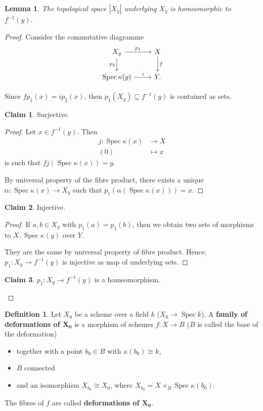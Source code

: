 \documentclass[12pt]{article}
\DeclareMathOperator{\Spec}{Spec}
\newtheorem*{lemma}{Lemma}
\theoremstyle{definition}
\newtheorem*{definition}{Definition}
\newtheorem*{claim}{Claim}
\begin{document}
\begin{lemma}
The topological space $|X_y|$ underlying $X_y$ is homeomorphic to $f^{-1}(y)$.
\end{lemma}

\begin{proof}
Consider the commutative diagramme
\[
\begin{tikzcd}
X_y\arrow[r,"p_1"]\arrow[d,"p_2",swap]&X\arrow[d,"f"]\\
\Spec\kappa(y)\arrow[r,"i"]&Y.
\end{tikzcd}
\]

Since $fp_1(x)=ip_2(x)$, then $p_1(X_y)\subseteq f^{-1}(y)$ is contained as sets.

\begin{claim}
Surjective.
\end{claim}

\begin{proof}
Let $x\in f^{-1}(y)$. Then
\begin{align*}
j:\Spec\kappa(x)&\longrightarrow X\\
(0)&\longmapsto x
\end{align*}
is such that $fj(\Spec\kappa(x))=y$.

By universal property of the fibre product, there exists a unique $\alpha:\Spec\kappa(x)\rightarrow X_y$ such that $p_1(\alpha(\Spec\kappa(x)))=x$.
\end{proof}

\begin{claim}
Injective.
\end{claim}

\begin{proof}
If $a,b\in X_y$ with $p_1(a)=p_1(b)$, then we obtain two sets of morphisms to $X,\Spec\kappa(y)$ over $Y$.

They are the same by universal property of fibre product. Hence, $p_1:X_y\rightarrow f^{-1}(y)$ is injective as map of underlying sets.
\end{proof}

\begin{claim}
$p_1:X_y\rightarrow f^{-1}(y)$ is a homeomorphism.
\end{claim}
\end{proof}

\begin{definition}
Let $X_0$ be a scheme over a field $k$ ($X_0\rightarrow\Spec k$). A \textbf{family of deformations of $\boldsymbol{X_0}$} is a morphism of schemes $f:X\rightarrow B$ ($B$ is called the base of the deformation)
\begin{itemize}[label=$-$]
\item together with a point $b_0\in B$ with $\kappa(b_0)\cong k$,
\item $B$ connected
\item and an isomorphism $X_{b_0}\cong X_0$, where $X_{b_0}=X\times_B\Spec\kappa(b_0)$.
\end{itemize}
The fibres of $f$ are called \textbf{deformations of $\boldsymbol{X_0}$}.
\end{definition}
\end{document}
